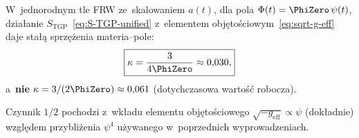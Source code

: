 \begin{proposition}%
\label{prop:kappa-corrected}

W~jednorodnym tle FRW ze~skalowaniem $a(t)$,
dla pola $\Phi(t) = \PhiZero\,\psi(t)$, dzia\l{}anie
$S_{\mathrm{TGP}}$~\eqref{eq:S-TGP-unified} z~elementem
obj\k{e}to\'sciowym~\eqref{eq:sqrt-g-eff} daje sta\l{}\k{a}
sprz\k{e}\.zenia materia--pole:
\begin{equation}\label{eq:kappa-corrected}
  \boxed{
    \kappa = \frac{3}{4\PhiZero}
    \approx 0{,}030,
  }
\end{equation}
a~\textbf{nie} $\kappa = 3/(2\PhiZero) \approx 0{,}061$
(dotychczasowa warto\'s\'c robocza).

Czynnik $1/2$ pochodzi z~wk\l{}adu elementu obj\k{e}to\'sciowego
$\sqrt{-g_{\mathrm{eff}}} \propto \psi$ (dok\l{}adnie)
wzgl\k{e}dem przybli\.zenia $\psi^4$
u\.zywanego w~poprzednich wyprowadzeniach.
\end{proposition}

